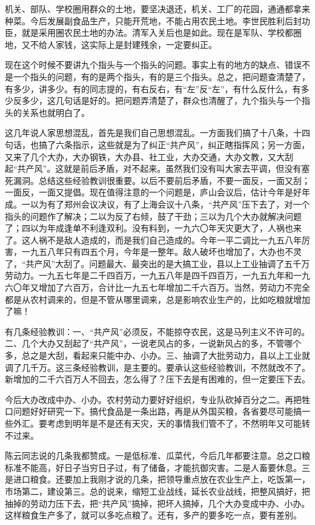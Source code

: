 机关、部队、学校圈用群众的土地，要坚决退还，机关、工厂的花园，通通都拿来种菜。今后发展副食品生产，只能开荒地，不能占用农民土地。李世民胜利后封功臣，就是采用圈农民土地的办法。清军入关后也是如此。现在是军队、学校都圈地，又不给人家钱，这实际上是封建残余，一定要纠正。

现在这个时候不要讲九个指头与一个指头的问题。事实上有的地方的缺点、错误不是一个指头的问题，有的是两个指头，有的是三个指头。总之，把问题查清楚了，有多少，讲多少。有的同志提的，有右反右，有“左”反“左”，有什么反什么，有多少反多少，这几句话是好的。把问题弄清楚了，群众也清醒了，九个指头与一个指头的关系也就明白了。

这几年说人家思想混乱，首先是我们自己思想混乱。一方面我们搞了十八条，十四句话，也搞了六条指示，这些就是为了纠正“共产风”，纠正瞎指挥风；另一方面，又来了几个大办，大办钢铁，大办县、社工业，大办交通，大办文教，又大刮起“共产风”。这就是前后矛盾，对不起来。虽然我们没有叫大家去平调，但没有塞死漏洞。总结这些经验教训很重要。以后不要前后矛盾，不要一面反，一面又刮；一面反，一面又提倡。现在值得注意的一个问题是，庐山会议后，估计今年是好年成。一以为有了郑州会议决议，有了上海会议十八条，“共产风”压下去了，对一个指头的问题作了解决；二以为反了右倾，鼓了干劲；三以为几个大办就解决问题了；四以为年成逢单不利逢双利。没有料到，一九六〇年天灾更大了，人祸也来了。这人祸不是敌人造成的，而是我们自己造成的。今年一平二调比一九五八年厉害，一九五八年只有四五个月，今年是一整年。敌人破坏也增加了，大办也不灵了，“共产风”大刮了。问题最大、最突出的是大搞工业，县以上工业抽调了五千万劳动力。一九五七年是二千四百万，一九五八年是四千四百万，一九五九年和一九六〇年又增加了六百万，合计比一九五七年增加二千六百万。当然，劳动力不完全都是从农村调来的，但是不管从哪里调来，总是影响农业生产的，比如吃粮就增加了嘛！

有几条经验教训：一、“共产风”必须反，不能掠夺农民，这是马列主义不许可的。二、几个大办又刮起了“共产风”，一说老风占的多，一说新风占的多，不管哪个多，总之是大刮，看起来只能中办、小办。三、抽调了大批劳动力，县以上工业就调了几千万。这三条经验教训，是主要的。要承认这些经验教训，不然就改不了。新增加的二千六百万人不回去，怎么得了？压下去是有困难的，但一定要压下去。

今后大办改成中办、小办。农村劳动力要好好组织，专业队砍掉百分之二。再把牲口问题好好研究一下。搞代食品是一条出路，再是从外国买粮，各省要尽可能搞一些外汇。要考虑到明年是不是还有天灾，天的事情我们管不了，不然明年又可能转不过来。

陈云同志说的几条我都赞成。一是低标准、瓜菜代，今后几年都要注意。总之口粮标准不能高，好日子当穷日子过，有了储备，才能抗御灾害。二是人畜要休息。三是进口粮食。还要加上我刚才说的几条，把领导重点放在农业生产上，吃饭第一，市场第二，建设第三。总的说来，缩短工业战线，延长农业战线，把整风搞好，把抽掉的劳动力压下去，把“共产风”搞掉，把坏人搞掉，几个大办变成中办、小办。这样粮食生产多了，就可以多吃点粮了。还有，多产的要多吃一点，要有差别。

